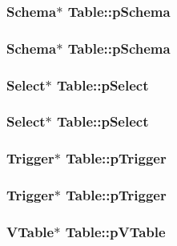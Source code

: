 \subsubsection{\setlength{\rightskip}{0pt plus 5cm}\bf{Schema}$\ast$ \bf{Table::p\-Schema}}\label{structTable_a6f0aa7bffd0075b7c2ffc03fa1e847b}


\subsubsection{\setlength{\rightskip}{0pt plus 5cm}\bf{Schema}$\ast$ \bf{Table::p\-Schema}}\label{structTable_a6f0aa7bffd0075b7c2ffc03fa1e847b}


\subsubsection{\setlength{\rightskip}{0pt plus 5cm}\bf{Select}$\ast$ \bf{Table::p\-Select}}\label{structTable_a8b8c27a26bc183b07e717f5eae68ff7}


\subsubsection{\setlength{\rightskip}{0pt plus 5cm}\bf{Select}$\ast$ \bf{Table::p\-Select}}\label{structTable_a8b8c27a26bc183b07e717f5eae68ff7}


\subsubsection{\setlength{\rightskip}{0pt plus 5cm}\bf{Trigger}$\ast$ \bf{Table::p\-Trigger}}\label{structTable_9151a5fdc59ed5b73a19d2607ddf8d5a}


\subsubsection{\setlength{\rightskip}{0pt plus 5cm}\bf{Trigger}$\ast$ \bf{Table::p\-Trigger}}\label{structTable_9151a5fdc59ed5b73a19d2607ddf8d5a}


\subsubsection{\setlength{\rightskip}{0pt plus 5cm}\bf{VTable}$\ast$ \bf{Table::p\-VTable}}\label{structTable_f228a11961b4a4a2fab3b0a106318aae}


